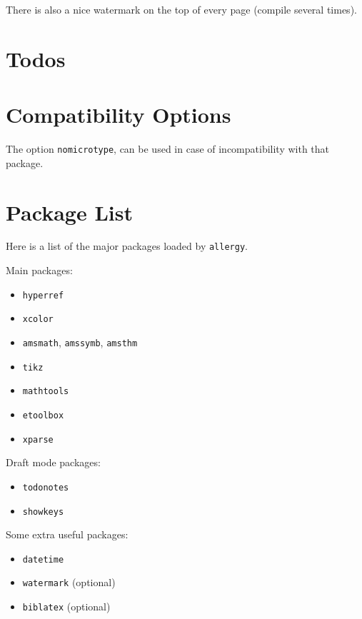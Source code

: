 \documentclass{scrartcl}
\begin{document}
There is also a nice watermark on the top of every page (compile several times).

\section{Todos}



\section{Compatibility Options}

The option \lstinline|nomicrotype|, can be used in case of incompatibility with that package.

\section{Package List}

Here is a list of the major packages loaded by \texttt{allergy}.

Main packages:
\begin{itemize}
\item \texttt{hyperref}
\item \texttt{xcolor}
\item \texttt{amsmath}, \texttt{amssymb}, \texttt{amsthm}
\item \texttt{tikz}
\item \texttt{mathtools}
\item \texttt{etoolbox}
\item \texttt{xparse}
\end{itemize}

Draft mode packages:
\begin{itemize}
\item \texttt{todonotes}
\item \texttt{showkeys}
\end{itemize}

Some extra useful packages:
\begin{itemize}
\item \texttt{datetime}
\item \texttt{watermark} (optional)
\item \texttt{biblatex} (optional)
\end{itemize}
\end{document}
